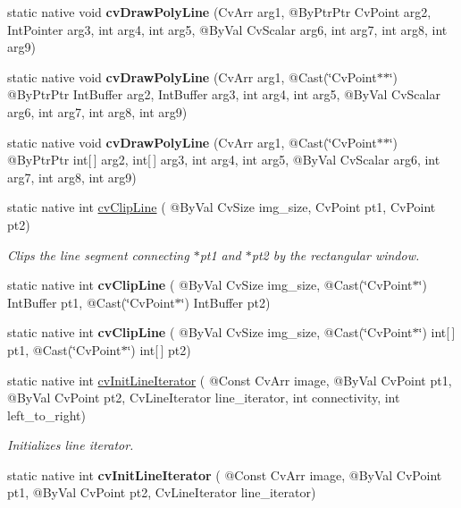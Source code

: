 \begin{DoxyCompactItemize}
\item 
static native void {\bfseries cv\+Draw\+Poly\+Line} (Cv\+Arr arg1, @By\+Ptr\+Ptr Cv\+Point arg2, Int\+Pointer arg3, int arg4, int arg5, @By\+Val Cv\+Scalar arg6, int arg7, int arg8, int arg9)
\item 
static native void {\bfseries cv\+Draw\+Poly\+Line} (Cv\+Arr arg1, @Cast(\char`\"{}Cv\+Point$\ast$$\ast$\char`\"{}) @By\+Ptr\+Ptr Int\+Buffer arg2, Int\+Buffer arg3, int arg4, int arg5, @By\+Val Cv\+Scalar arg6, int arg7, int arg8, int arg9)
\item 
static native void {\bfseries cv\+Draw\+Poly\+Line} (Cv\+Arr arg1, @Cast(\char`\"{}Cv\+Point$\ast$$\ast$\char`\"{}) @By\+Ptr\+Ptr int\mbox{[}$\,$\mbox{]} arg2, int\mbox{[}$\,$\mbox{]} arg3, int arg4, int arg5, @By\+Val Cv\+Scalar arg6, int arg7, int arg8, int arg9)
\item 
static native int \hyperlink{group__imgproc__c_ga1bff7c65c8a997286cfb28f978c3d9f4}{cv\+Clip\+Line} ( @By\+Val Cv\+Size img\+\_\+size, Cv\+Point pt1, Cv\+Point pt2)
\begin{DoxyCompactList}\small\item\em Clips the line segment connecting $\ast$pt1 and $\ast$pt2 by the rectangular window. \end{DoxyCompactList}\item 
static native int {\bfseries cv\+Clip\+Line} ( @By\+Val Cv\+Size img\+\_\+size, @Cast(\char`\"{}Cv\+Point$\ast$\char`\"{}) Int\+Buffer pt1, @Cast(\char`\"{}Cv\+Point$\ast$\char`\"{}) Int\+Buffer pt2)
\item 
static native int {\bfseries cv\+Clip\+Line} ( @By\+Val Cv\+Size img\+\_\+size, @Cast(\char`\"{}Cv\+Point$\ast$\char`\"{}) int\mbox{[}$\,$\mbox{]} pt1, @Cast(\char`\"{}Cv\+Point$\ast$\char`\"{}) int\mbox{[}$\,$\mbox{]} pt2)
\item 
static native int \hyperlink{group__imgproc__c_gac6827dd42663e5c95d5c78bd9bce2470}{cv\+Init\+Line\+Iterator} ( @Const Cv\+Arr image, @By\+Val Cv\+Point pt1, @By\+Val Cv\+Point pt2, Cv\+Line\+Iterator line\+\_\+iterator, int connectivity, int left\+\_\+to\+\_\+right)
\begin{DoxyCompactList}\small\item\em Initializes line iterator. \end{DoxyCompactList}\item 
static native int {\bfseries cv\+Init\+Line\+Iterator} ( @Const Cv\+Arr image, @By\+Val Cv\+Point pt1, @By\+Val Cv\+Point pt2, Cv\+Line\+Iterator line\+\_\+iterator)
\item 

\end{DoxyCompactItemize}
